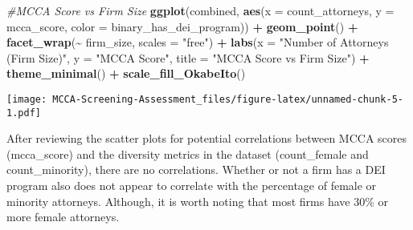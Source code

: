 \documentclass[
]{article}
\newenvironment{Shaded}{\begin{snugshade}}{\end{snugshade}}
\newcommand{\AttributeTok}[1]{\textcolor[rgb]{0.13,0.29,0.53}{#1}}
\newcommand{\CommentTok}[1]{\textcolor[rgb]{0.56,0.35,0.01}{\textit{#1}}}
\newcommand{\FunctionTok}[1]{\textcolor[rgb]{0.13,0.29,0.53}{\textbf{#1}}}
\newcommand{\NormalTok}[1]{#1}
\newcommand{\SpecialCharTok}[1]{\textcolor[rgb]{0.81,0.36,0.00}{\textbf{#1}}}
\newcommand{\StringTok}[1]{\textcolor[rgb]{0.31,0.60,0.02}{#1}}
\begin{document}
\begin{Shaded}
\begin{Highlighting}[]
\CommentTok{\#MCCA Score vs Firm Size}
\FunctionTok{ggplot}\NormalTok{(combined, }\FunctionTok{aes}\NormalTok{(}\AttributeTok{x =}\NormalTok{ count\_attorneys, }\AttributeTok{y =}\NormalTok{ mcca\_score, }\AttributeTok{color =}\NormalTok{ binary\_has\_dei\_program)) }\SpecialCharTok{+}
  \FunctionTok{geom\_point}\NormalTok{() }\SpecialCharTok{+}
  \FunctionTok{facet\_wrap}\NormalTok{(}\SpecialCharTok{\textasciitilde{}}\NormalTok{ firm\_size, }\AttributeTok{scales =} \StringTok{"free"}\NormalTok{) }\SpecialCharTok{+}
  \FunctionTok{labs}\NormalTok{(}\AttributeTok{x =} \StringTok{"Number of Attorneys (Firm Size)"}\NormalTok{, }
       \AttributeTok{y =} \StringTok{"MCCA Score"}\NormalTok{, }
       \AttributeTok{title =} \StringTok{"MCCA Score vs Firm Size"}\NormalTok{) }\SpecialCharTok{+}
  \FunctionTok{theme\_minimal}\NormalTok{() }\SpecialCharTok{+}
  \FunctionTok{scale\_fill\_OkabeIto}\NormalTok{()}
\end{Highlighting}
\end{Shaded}

\texttt{[image: MCCA-Screening-Assessment\_files/figure-latex/unnamed-chunk-5-1.pdf]}

After reviewing the scatter plots for potential correlations between
MCCA scores (mcca\_score) and the diversity metrics in the dataset
(count\_female and count\_minority), there are no correlations. Whether
or not a firm has a DEI program also does not appear to correlate with
the percentage of female or minority attorneys. Although, it is worth
noting that most firms have 30\% or more female attorneys.
\end{document}
